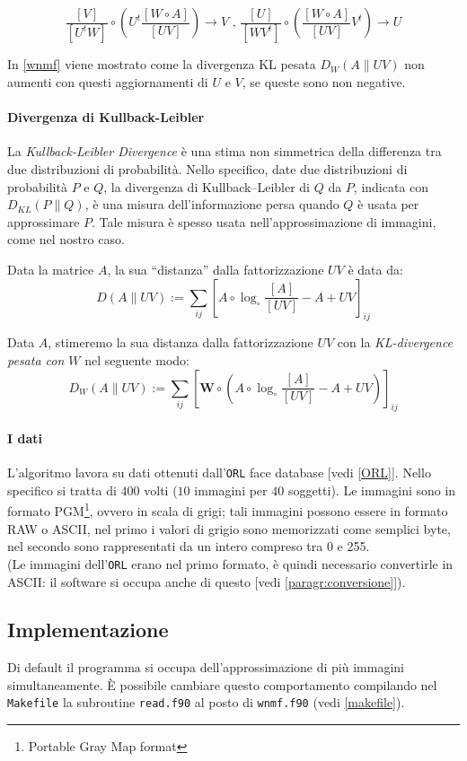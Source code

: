\documentclass[a4paper]{article} %
\begin{document}
\[ \frac{[V]}{[U^tW]} \circ \left( U^t \frac{[W \circ A]}{[UV]} \right) \rightarrow V \text{ , } \frac{[U]}{[WV^t]} \circ \left( \frac{[W \circ A]}{[UV]}V^t \right) \rightarrow U \]

\vspace{5mm}
In \ref{wnmf} viene mostrato come la divergenza KL pesata $D_W(A\lVert UV)$ non aumenti con questi aggiornamenti di $U$ e $V$, se queste sono non negative.

\paragraph{Divergenza di Kullback-Leibler}\label{KL-div}
La \emph{Kullback-Leibler Divergence} è una stima non simmetrica della differenza tra due distribuzioni di probabilità. Nello specifico, date due distribuzioni di probabilità $P$ e $Q$, la divergenza di Kullback–Leibler di $Q$ da $P$, indicata con $D_{KL}(P \lVert Q)$, è una misura dell'informazione persa quando $Q$ è usata per approssimare $P$. Tale misura è spesso usata nell'approssimazione di immagini, come nel nostro caso.

Data la matrice $A$, la sua ``distanza'' dalla fattorizzazione $UV$ è data da:
\[ D(A \lVert UV) := \sum_{ij} \left[ A \circ \log_{\circ} \frac{[A]}{[UV]} - A + UV \right]_{ij} \]

Data $A$, stimeremo la sua distanza dalla fattorizzazione $UV$ con la \emph{KL-divergence \emph{pesata} con $W$} nel seguente modo:
\[ D_W(A \lVert UV) := \sum_{ij} \left[ \textbf{W} \circ \left( A \circ \log_{\circ} \frac{[A]}{[UV]} - A + UV \right) \right]_{ij} \]

\paragraph{I dati}\label{faces}
L'algoritmo lavora su dati ottenuti dall'\texttt{ORL} face database [vedi \ref{ORL}].
Nello specifico si tratta di $400$ volti ($10$ immagini per $40$ soggetti). Le immagini sono in formato PGM\footnote{Portable Gray Map format}, ovvero in scala di grigi; tali immagini possono essere in formato RAW o ASCII, nel primo i valori di grigio sono memorizzati come semplici byte, nel secondo sono rappresentati da un intero compreso tra 0 e 255. \\ 
(Le immagini dell'\texttt{ORL} erano nel primo formato, è quindi necessario convertirle in ASCII: il software si occupa anche di questo [vedi \ref{paragr:conversione}]).

\subsection{Implementazione}
Di default il programma si occupa dell'approssimazione di più immagini simultaneamente.
È possibile cambiare questo comportamento compilando nel \texttt{Makefile} la subroutine \texttt{read.f90} al posto di \texttt{wnmf.f90} (vedi \ref{makefile}).
\end{document}
